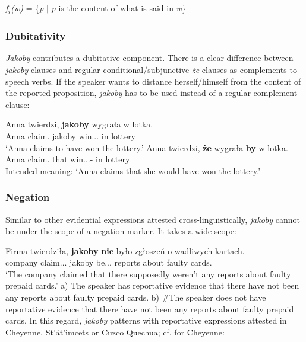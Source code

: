 \documentclass[output=paper
,modfonts
,nonflat]{langsci/langscibook}
\begin{document}
\ea  \emph{f\textsubscript{r}(w)} = \{\emph{p} $ \mid $ \emph{p} is the content of what is said in \emph{w}\} \z

 \subsubsection{Dubitativity}
 \emph{Jakoby} contributes a dubitative component. There is a clear difference between \emph{jakoby}-clauses and regular conditional\slash subjunctive \emph{że}-clauses as complements to speech verbs. If the speaker wants to distance herself\slash himself from the content of the reported proposition, \emph{jakoby} has to be used instead of a regular complement clause:

\ea \ea \gll	Anna twierdzi, \textbf{jakoby} wygrała w lotka. \\
		Anna claim.{\thirdperson}{\sg} jakoby win.{\lptcp}.{\sg}.{\fem} in lottery \\
	\glt	`Anna claims to have won the lottery.'
	\ex\gll	*Anna twierdzi, \textbf{że} wygrała-\textbf{by} w lotka. \\
            Anna claim.{\thirdperson}{\sg} that win.{\lptcp}.{\sg}.{\fem}-{\subj} in lottery \\
	\glt	Intended meaning: `Anna claims that she would have won the lottery.'
\z\z
\subsubsection{Negation}
Similar to other evidential expressions attested cross-linguistically, \emph{jakoby} cannot be under the scope of a negation marker. It takes a wide scope:

\ea \gll Firma twierdziła, \textbf{jakoby} \textbf{nie} było zgłoszeń o wadliwych kartach.\\
		company claim.{\lptcp}.{\sg}.{\fem} jakoby {\negation} be.{\lptcp}.{\sg}.{\n} reports about faulty cards.{\LOC}\\
		\newline
		`The company claimed that there supposedly weren't any reports about faulty prepaid cards.' \newline
\glt	a) The speaker has reportative evidence that there have not been any reports about faulty prepaid cards.
\glt	b) \#The speaker does not have reportative evidence that there have not been any reports about faulty prepaid cards.
\z
In this regard, \emph{jakoby} patterns with reportative expressions attested in Cheyenne, St'át'imcets or Cuzco Quechua; cf.  for Cheyenne:
\end{document}
